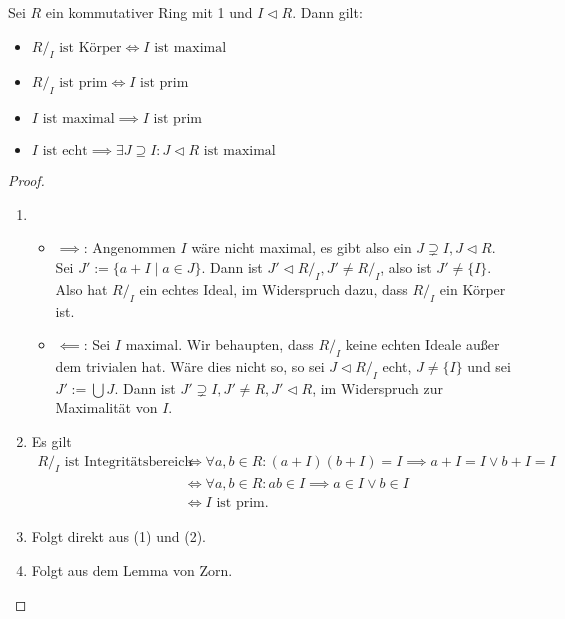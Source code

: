 \begin{proposition}
    Sei $R$ ein kommutativer Ring mit 1 und $I \vartriangleleft R$. Dann gilt:
    \begin{itemize}
        \item $R /_{I} \text{ ist Körper} \Leftrightarrow I \text{ ist maximal}$
        \item $R /_{I} \text{ ist prim} \Leftrightarrow I \text{ ist prim}$
        \item $I \text{ ist maximal} \implies I \text{ ist prim}$
        \item $I \text{ ist echt} \implies \exists J \supseteq I: J \vartriangleleft R \text{ ist maximal}$
    \end{itemize}
\end{proposition}

\begin{proof}{\ }
    \begin{enumerate}
        \item \begin{itemize}
            \item $\implies$: Angenommen $I$ wäre nicht maximal, es gibt also ein $J \supsetneq I, J \vartriangleleft R$.
            Sei $J' := \{ a + I \mid a \in J \}$. Dann ist $J' \vartriangleleft R/_I, J' \neq R/_I$, also ist $J' \neq \{I\}$. Also hat $R/_I$ ein echtes Ideal, im Widerspruch dazu, dass $R/_I$ ein Körper ist.
            \item $\impliedby$: Sei $I$ maximal. Wir behaupten, dass $R/_I$ keine echten Ideale außer dem trivialen hat. Wäre dies nicht so, so sei $J \vartriangleleft R/_I$ echt, $J \neq \{I\}$ und sei $J' := \bigcup J$. Dann ist $J' \supsetneq I, J' \neq R, J' \vartriangleleft R$, im Widerspruch zur Maximalität von $I$.
        \end{itemize}
        \item Es gilt
        \begin{align*}
            R/_I \text{ ist Integritätsbereich} &\Leftrightarrow \forall a, b \in R: (a + I)(b + I) = I \implies a + I = I \lor b + I = I \\
            &\Leftrightarrow \forall a, b \in R: ab \in I \implies a \in I \lor b \in I \\
            &\Leftrightarrow I \text{ ist prim}.
        \end{align*}
        \item Folgt direkt aus (1) und (2).
        \item Folgt aus dem Lemma von Zorn.
    \end{enumerate}
\end{proof}